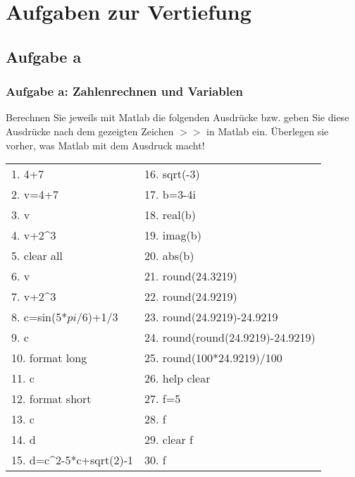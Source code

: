 


\usepackage{amsmath}
\usepackage{mathtools}
\setcounter{mchapter}{6}
\setcounter{mexercise}{0}


  

  \section{Aufgaben zur Vertiefung}

  \subsection{Aufgabe a}
  	\begin{frame}
		\frametitle{Aufgabe a: Zahlenrechnen und Variablen}
          \begin{exercise}
              \sloppy          
           Berechnen Sie jeweils mit Matlab die folgenden Ausdrücke bzw. geben Sie diese Ausdrücke nach dem gezeigten Zeichen \texttt{$>>$} in Matlab ein.
Überlegen sie vorher, was Matlab mit dem Ausdruck macht!

		   \begin{footnotesize}     	
      	 	\begin{tabular}{ll}
        	  1. 4+7 & 16. sqrt(-3) \\
        	  2. v=4+7 & 17. b=3-4i \\ 
        	  3. v & 18. real(b) \\
        	  4. v+2\textasciicircum 3 & 19. imag(b) \\ 
        	  5. clear all & 20. abs(b) \\
        	  6. v & 21. round(24.3219)\\
        	  7. v+2\textasciicircum 3 & 22. round(24.9219)\\ 
          	  8. c=sin(5*$pi$/6)+1/3 & 23. round(24.9219)-24.9219 \\
          	  9. c & 24. round(round(24.9219)-24.9219)\\          	 
          	  10. format long & 25. round(100*24.9219)/100\\
          	  11. c & 26. help clear\\
          	  12. format short & 27. f=5 \\
          	  13. c & 28. f \\
          	  14. d & 29. clear f \\
          	  15. d=c\textasciicircum 2-5*c+sqrt(2)-1 & 30. f         	          	  
            \end{tabular} 
           \end{footnotesize}       	      
	            
		  \end{exercise}
   		\end{frame}

